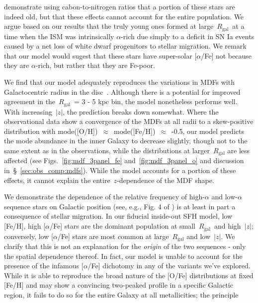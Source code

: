 \documentclass[fleqn, usenatbib]{mnras}
\begin{document}
\citet{Hekker2019} demonstrate using cabon-to-nitrogen ratios that a portion of 
these stars are indeed old, but that these effects cannot account for the 
entire population. We argue based on our results that the truly young ones 
formed at large~$R_\text{gal}$~at a time when the ISM was intrinsically 
$\alpha$-rich due simply to a deficit in SN Ia events caused by a net loss of 
white dwarf progenitors to stellar migration. We remark that our model would 
sugest that these stars have super-solar [$\alpha$/Fe] not because they are 
$\alpha$-rich, but rather that they are Fe-poor. 
\par 
We find that our model adequately reproduces the variations in MDFs with 
Galactocentric radius in the disc~\citep{Hayden2015}. Although there is a 
potential for improved agreement in the~$R_\text{gal}$~= 3 - 5 kpc bin, the 
model nonetheless performs well. With increasing~$\left|z\right|$, the 
prediction breaks down somewhat. Where the observational data show a 
convergence of the MDFs at all radii to a skew-positive distribution with 
mode([O/H])~$\approx$~mode([Fe/H])~$\approx$~-0.5, our model predicts the mode 
abundance in the inner Galaxy to decrease slightly, though not to the same 
extent as in the observations, while the distributions at larger~$R_\text{gal}$ 
are less affected (see Figs.~\ref{fig:mdf_3panel_fe} and~\ref{fig:mdf_3panel_o} 
and discussion in~\S~\ref{sec:obs_comp:mdfs}). While the model accounts for a 
portion of these effects, it cannot explain the entire~$z$-dependence of the 
MDF shape. 
\par 
We demonstrate the dependence of the relative frequency of high-$\alpha$ and 
low-$\alpha$ sequence stars on Galactic position (see, e.g., Fig. 4 of 
\citealp{Hayden2015}) is at least in part a consequence of stellar migration. 
In our fiducial inside-out SFH model, low [Fe/H], high [$\alpha$/Fe] stars 
are the dominant population at small~$R_\text{gal}$~and high~$\left|z\right|$; 
conversely, low [$\alpha$/Fe] stars are most common at large~$R_\text{gal}$ 
and low~$\left|z\right|$. We clarify that this is not an explanation for the 
\textit{origin} of the two sequences - only the spatial dependence thereof. 
In fact, our model is unable to account for the presence of the infamous 
[$\alpha$/Fe] dichotomy in any of the variants we've explored. While it is able 
to reproduce the broad nature of the [O/Fe] distributions at fixed [Fe/H] and 
may show a convincing two-peaked profile in a specific Galactic region, it 
fails to do so for the entire Galaxy at all metallicities; the principle 
\end{document}
